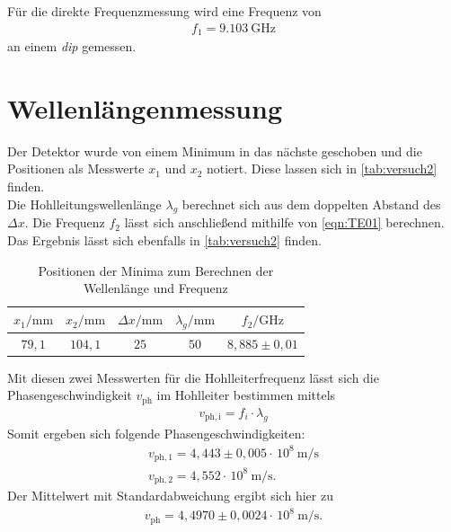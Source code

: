 Für die direkte Frequenzmessung wird eine Frequenz von
\begin{align*}
    f_1 = \qty{9,103}{\giga\hertz}
\end{align*}
an einem \textit{dip} gemessen.

\section{Wellenlängenmessung}

Der Detektor wurde von einem Minimum in das nächste geschoben und die Positionen als Messwerte $x_1$ und $x_2$ notiert. Diese lassen sich in \autoref{tab:versuch2} finden.\\
Die Hohlleitungswellenlänge $\lambda_g$ berechnet sich aus dem doppelten Abstand des $\Delta x$. Die Frequenz $f_2$ lässt sich anschließend mithilfe von \autoref{eqn:TE01} berechnen.
Das Ergebnis lässt sich ebenfalls in \autoref{tab:versuch2} finden.\\

\begin{table}[htbp] 
    \centering 
    \begin{tabular}{c c c c c} 
        \toprule $x_1 / \mathrm{mm}$ & $x_2 / \mathrm{mm}$ & $\Delta x / \mathrm{mm}$ & $\lambda_g / \mathrm{mm}$ & $f_2 / \mathrm{GHz}$ \\ 
        \midrule 
        $79,1$  &  $104,1$ &  $25$ & $50$ &$ 8,885  \pm 0,01$ \\
        \bottomrule 
    \end{tabular} 
    \caption[Tabelle]{Positionen der Minima zum Berechnen der Wellenlänge und Frequenz} 
    \label{tab:versuch2} 
\end{table}

Mit diesen zwei Messwerten für die Hohlleiterfrequenz lässt sich die Phasengeschwindigkeit $v_{\mathrm{ph}}$ im Hohlleiter bestimmen mittels
\begin{align*}
    v_{\mathrm{ph, i}} = f_i \cdot  \lambda_g
\end{align*}
Somit ergeben sich folgende Phasengeschwindigkeiten:
\begin{align*}
    v_{\mathrm{ph, 1}} = 4,443 \pm 0,005\cdot \, 10^8 \qty{}{\metre\per\second} \\
    v_{\mathrm{ph, 2}} = 4,552 \cdot \, 10^8 \qty{}{\metre\per\second} .
\end{align*}
Der Mittelwert mit Standardabweichung ergibt sich hier zu
\begin{align*}
    v_{\mathrm{ph}} = 4,4970 \pm 0,0024  \cdot \, 10^8 \qty{}{\metre\per\second} .
\end{align*}

